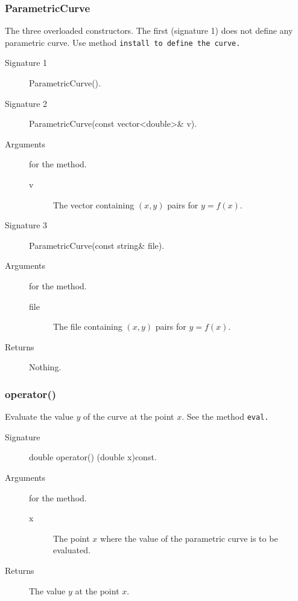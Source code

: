 \subsubsection{ParametricCurve}
The three overloaded constructors. The first (signature 1) does not define
any parametric curve. Use method \tt install \rm  to define
the curve. 
 
\begin{description}
    \item [Signature 1] ParametricCurve().
    \item [Signature 2] ParametricCurve(const vector<double>\& v).
    \item [Arguments] for the method.
	\begin{description}
           \item [v] The vector containing $(x,y)$ pairs for $y =
    f(x)$. 
        \end{description}
     \item [Signature 3] ParametricCurve(const string\& file).
    \item [Arguments] for the method.
       \begin{description}
           \item [file] The file containing $(x,y)$ pairs for $y =
    f(x)$. 
         \end{description} 
    \item [Returns] Nothing.
\end{description} 

\subsubsection{operator()}
Evaluate the value $y$ of the curve at the point $x$. 
See the method \tt eval\rm.
\begin{description}
   \item [Signature] double  operator() (double x)const.
   \item [Arguments] for the method.
     \begin{description}
        \item [x] The point $x$ where the value of the parametric curve 
                  is to be evaluated.
       \end{description}
    \item [Returns] The value $y$ at the point $x$.
\end{description} 

